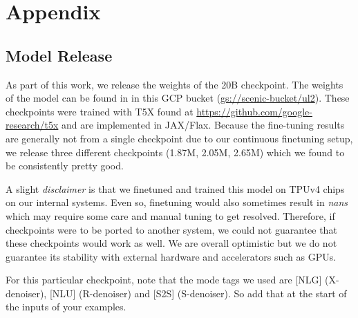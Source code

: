 \documentclass[10pt]{article}
\begin{document}



\newpage
\section{Appendix}

\subsection{Model Release}
As part of this work, we release the weights of the 20B checkpoint. The weights of the model can be found in in this GCP bucket ({\url{gs://scenic-bucket/ul2}}). These checkpoints were trained with T5X \citep{https://doi.org/10.48550/arxiv.2203.17189} found at  \url{https://github.com/google-research/t5x} and are implemented in JAX/Flax. Because the fine-tuning results are generally not from a single checkpoint due to our continuous finetuning setup, we release three different checkpoints (1.87M, 2.05M, 2.65M) which we found to be consistently pretty good.

A slight \textit{disclaimer} is that we finetuned and trained this model on TPUv4 chips on our internal systems. Even so, finetuning would also sometimes result in \textit{nans} which may require some care and manual tuning to get resolved. Therefore, if checkpoints were to be ported to another system, we could not  guarantee that these checkpoints would work as well. We are overall optimistic but we do not guarantee its stability with external hardware and accelerators such as GPUs.

For this particular checkpoint, note that the mode tags we used are [NLG] (X-denoiser), [NLU] (R-denoiser) and [S2S] (S-denoiser). So add that at the start of the inputs of your examples. 
\end{document}

